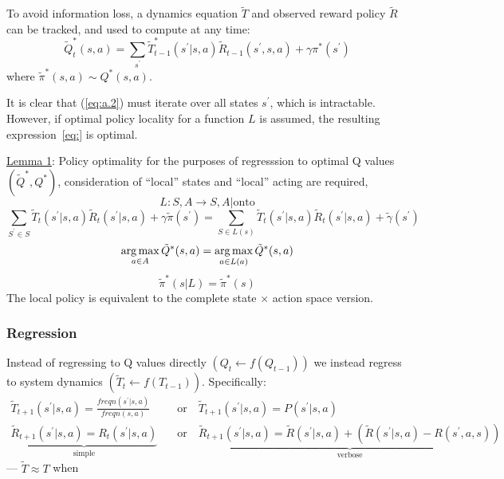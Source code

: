 To avoid information loss, a dynamics equation $\tilde{T}$ and observed reward policy $\tilde{R}$ can be tracked, and used to compute at any
 time:
\begin{equation}
\tilde{Q}^\ast_t( s, a ) = \sum_{s^\prime} \tilde{T}_{t-1}^\ast ( s^\prime | s, a ) \tilde{R}_{t-1}( s^\prime, s, a ) + \gamma \pi^\ast( s^\prime ) \label{eq:a.2} 
\end{equation}
where $\tilde{\pi}^\ast( s, a ) \sim Q^\ast( s, a )$. 

It is clear that (\ref{eq:a.2}) must iterate over all states $s^\prime$, which is intractable. However, if optimal policy locality for a function $L$ is assumed, the resulting expression~\ref{eq:} is optimal.

\underline{Lemma 1}: Policy optimality for the purposes of regresssion to optimal Q values $(\tilde{Q}^\ast, Q^\ast )$, consideration of ``local'' states and ``local'' acting are required,
\begin{equation}
L:S,A\to S,A | \text{onto}
\end{equation}
\begin{equation}
\sum_{S^\prime \in S} \tilde{T}_t ( s^\prime | s, a ) \tilde{R}_t( s^\prime | s, a ) +\gamma \tilde{\pi}( s^\prime )  = \sum_{S \in L(s)}  \tilde{T}_{t}( s^\prime | s, a ) \tilde{R}_t( s^\prime | s, a ) + \tilde{\gamma}( s^\prime )
\end{equation}
\begin{equation}
\operatorname*{arg\,max}_{a \in A}\tilde{Q}^\ast( s, a ) = \operatorname*{arg\,max}_{a\in L(a)} \tilde{Q}^\ast( s, a )
\end{equation}
\begin{equation}
\tilde{\pi}^\ast( s | L ) = \tilde{\pi}^\ast( s )
\end{equation}
The local policy is equivalent to the complete state $\times$ action space version.\\

\subsubsection{Regression} 

Instead of regressing to Q values directly $\left( Q_t \leftarrow f(Q_{t-1}) \right)$ we instead regress to system dynamics $\left( \tilde{T}_t \leftarrow f( T_{t-1} ) \right)$. Specifically:
\begin{align}
\tilde{T}_{t+1}( s^\prime | s, a ) = \frac{\textit{freqn}(s^\prime | s, a )}{\textit{freqn}( s, a )} & \quad\text{or}\quad \tilde{T}_{t+1}( s^\prime | s, a ) = P( s^\prime | s, a ) \\
\underbrace{\tilde{R}_{t+1}( s^\prime | s, a ) = R_t( s^\prime | s, a )}_{\text{simple}} & \quad\text{or}\quad \underbrace{\tilde{R}_{t+1}( s^\prime | s, a ) = \tilde{R}( s^\prime | s, a ) + \left( \tilde{R}( s^\prime | s, a ) - R( s^\prime, a, s ) \right)}_{\text{verbose}} 
\end{align}
\textasteriskcentered --- $\tilde{T} \approx T$ when

